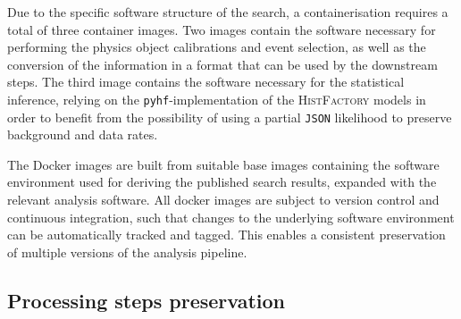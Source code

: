 Due to the specific software structure of the \onelepton search, a containerisation requires a total of three container images.
Two images contain the software necessary for performing the physics object calibrations and event selection, as well as the conversion of the information in a format that can be used by the downstream steps. The third image contains the software necessary for the statistical inference, relying on the \texttt{pyhf}-implementation of the \textsc{HistFactory} models in order to benefit from the possibility of using a partial \texttt{JSON} likelihood to preserve background and data rates.
%  

The Docker images are built from suitable base images containing the software environment used for deriving the published \onelepton search results, expanded with the relevant analysis software. All docker images are subject to version control and continuous integration, such that changes to the underlying software environment can be automatically tracked and tagged. This enables a consistent preservation of multiple versions of the analysis pipeline.

\subsection{Processing steps preservation}

